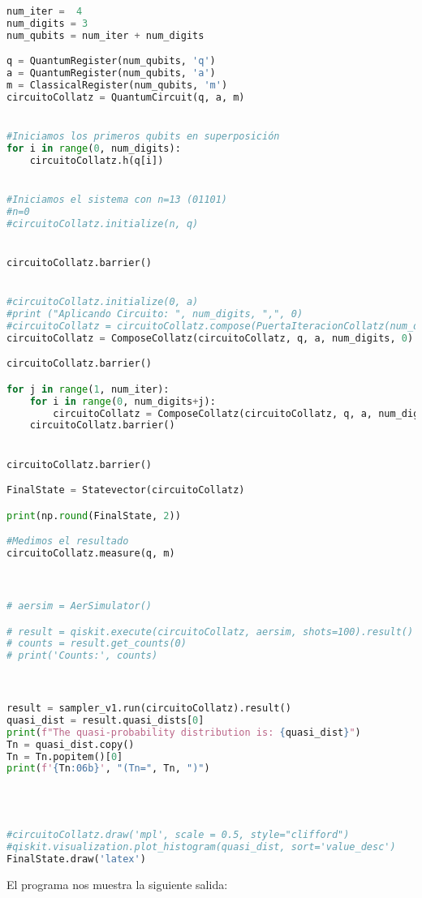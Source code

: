 \begin{lstlisting}[language=Python]
num_iter =  4
num_digits = 3
num_qubits = num_iter + num_digits

q = QuantumRegister(num_qubits, 'q')
a = QuantumRegister(num_qubits, 'a')
m = ClassicalRegister(num_qubits, 'm')
circuitoCollatz = QuantumCircuit(q, a, m)


#Iniciamos los primeros qubits en superposición
for i in range(0, num_digits):
    circuitoCollatz.h(q[i])


#Iniciamos el sistema con n=13 (01101)
#n=0
#circuitoCollatz.initialize(n, q)


circuitoCollatz.barrier()


#circuitoCollatz.initialize(0, a)
#print ("Aplicando Circuito: ", num_digits, ",", 0)
#circuitoCollatz = circuitoCollatz.compose(PuertaIteracionCollatz(num_digits), qubits = [q[0], q[1], q[2], q [3], a[0], a[1], a[2]])
circuitoCollatz = ComposeCollatz(circuitoCollatz, q, a, num_digits, 0)

circuitoCollatz.barrier()

for j in range(1, num_iter):
    for i in range(0, num_digits+j):
        circuitoCollatz = ComposeCollatz(circuitoCollatz, q, a, num_digits+j- i, i)
    circuitoCollatz.barrier()


circuitoCollatz.barrier()

FinalState = Statevector(circuitoCollatz)

print(np.round(FinalState, 2))

#Medimos el resultado
circuitoCollatz.measure(q, m)



# aersim = AerSimulator()

# result = qiskit.execute(circuitoCollatz, aersim, shots=100).result()
# counts = result.get_counts(0)
# print('Counts:', counts)



result = sampler_v1.run(circuitoCollatz).result()
quasi_dist = result.quasi_dists[0]
print(f"The quasi-probability distribution is: {quasi_dist}")
Tn = quasi_dist.copy()
Tn = Tn.popitem()[0]
print(f'{Tn:06b}', "(Tn=", Tn, ")")




#circuitoCollatz.draw('mpl', scale = 0.5, style="clifford")
#qiskit.visualization.plot_histogram(quasi_dist, sort='value_desc')
FinalState.draw('latex')
\end{lstlisting}

El programa nos muestra la siguiente salida:


